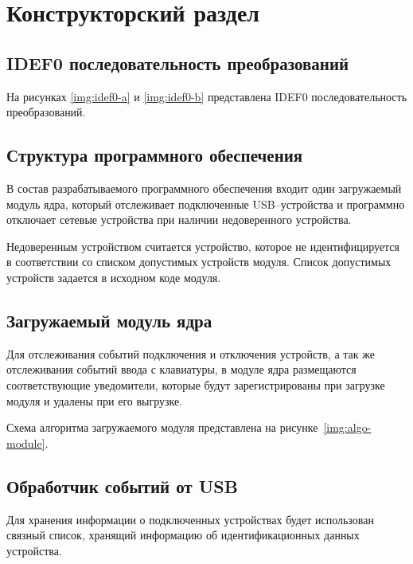 \chapter{Конструкторский раздел}

\section{IDEF0 последовательность преобразований}

На рисунках \ref{img:idef0-a} и \ref{img:idef0-b} представлена IDEF0 последовательность преобразований.




\section{Структура программного обеспечения}

В состав разрабатываемого программного обеспечения входит один загружаемый модуль ядра, который отслеживает подключенные USB--устройства и программно отключает сетевые устройства при наличии недоверенного устройства. 

Недоверенным устройством считается устройство, которое не идентифицируется в соответствии со списком допустимых устройств модуля. Список допустимых устройств задается в исходном коде модуля.

\section{Загружаемый модуль ядра}

Для отслеживания событий подключения и отключения устройств, а так же отслеживания событий ввода с клавиатуры, в модуле ядра размещаются соответствующие уведомители, которые будут зарегистрированы при загрузке модуля и удалены при его выгрузке.

Схема алгоритма загружаемого модуля представлена на рисунке~\ref{img:algo-module}.


\section{Обработчик событий от USB}

Для хранения информации о подключенных устройствах будет использован связный список, хранящий информацию об идентификационных данных устройства.

